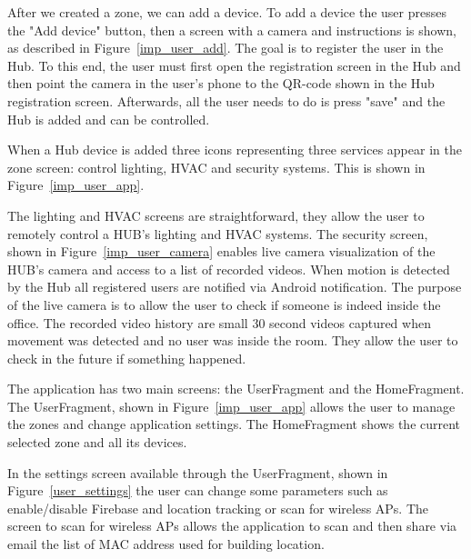 After we created a zone, we can add a device. To add a device the user presses the "Add device" button, then a screen with a camera and instructions is shown, as described in Figure~\ref{imp_user_add}. The goal is to register the user in the Hub. To this end, the user must first open the registration screen in the Hub and then point the camera in the user's phone to the QR-code shown in the Hub registration screen. Afterwards, all the user needs to do is press "save" and the Hub is added and can be controlled.


When a Hub device is added three icons representing three services appear in the zone screen: control lighting, \ac{HVAC} and security systems. This is shown in Figure~\ref{imp_user_app}.

The lighting and \ac{HVAC} screens are straightforward, they allow the user to remotely control a HUB's lighting and \ac{HVAC} systems. The security screen, shown in Figure~\ref{imp_user_camera} enables live camera visualization of the HUB's camera and access to a list of recorded videos. When motion is detected by the Hub all registered users are notified via Android notification. The purpose of the live camera is to allow the user to check if someone is indeed inside the office. The recorded video history are small 30 second videos captured when movement was detected and no user was inside the room. They allow the user to check in the future if something happened.


The application has two main screens: the UserFragment and the HomeFragment. The UserFragment, shown in Figure~\ref{imp_user_app} allows the user to manage the zones and change application settings. The HomeFragment shows the current selected zone and all its devices.

In the settings screen available through the UserFragment, shown in Figure~\ref{user_settings} the user can change some parameters such as enable/disable Firebase and location tracking or scan for wireless APs. The screen to scan for wireless APs allows the application to scan and then share via email the list of \ac{MAC address} used for building location.





